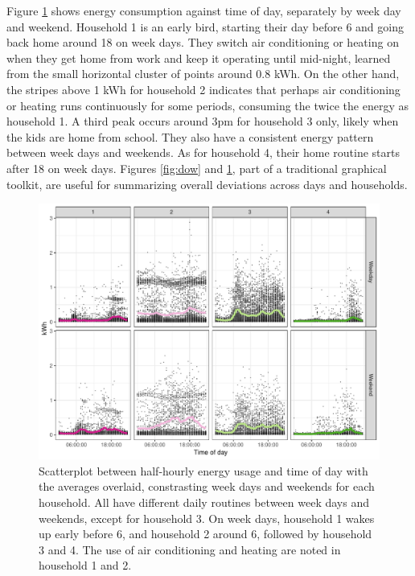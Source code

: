 \documentclass[12pt]{article}
\begin{document}
Figure \ref{fig:hod} shows energy consumption against time of day,
separately by week day and weekend. Household 1 is an early bird,
starting their day before 6 and going back home around 18 on week days.
They switch air conditioning or heating on when they get home from work
and keep it operating until mid-night, learned from the small horizontal
cluster of points around 0.8 kWh. On the other hand, the stripes above 1
kWh for household 2 indicates that perhaps air conditioning or heating
runs continuously for some periods, consuming the twice the energy as
household 1. A third peak occurs around 3pm for household 3 only, likely
when the kids are home from school. They also have a consistent energy
pattern between week days and weekends. As for household 4, their home
routine starts after 18 on week days. Figures \ref{fig:dow} and
\ref{fig:hod}, part of a traditional graphical toolkit, are useful for
summarizing overall deviations across days and households.

\begin{figure}

{\centering \includegraphics[width=\textwidth]{figure/hod-1} 

}

\caption{Scatterplot between half-hourly energy usage and time of day with the averages overlaid, constrasting week days and weekends for each household. All have different daily routines between week days and weekends, except for household 3. On week days, household 1 wakes up early before 6, and household 2 around 6, followed by household 3 and 4. The use of air conditioning and heating are noted in household 1 and 2.}\label{fig:hod}
\end{figure}
\end{document}
